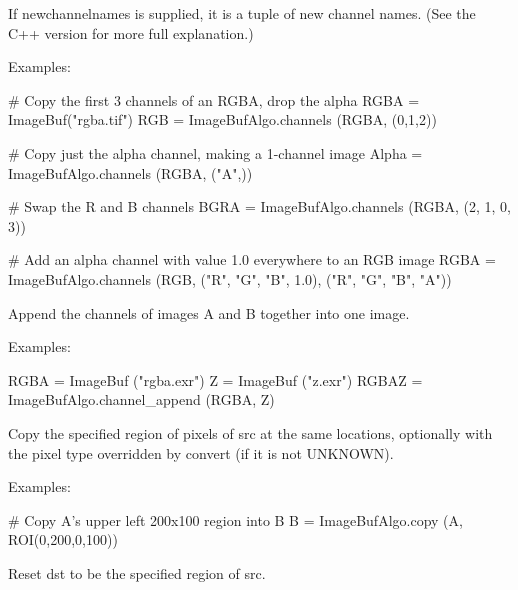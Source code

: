 If {\cf newchannelnames} is supplied, it is a tuple of new channel
names. (See the C++ version for more full explanation.)

\smallskip
\noindent Examples:
\begin{code}
    # Copy the first 3 channels of an RGBA, drop the alpha
    RGBA = ImageBuf("rgba.tif")
    RGB = ImageBufAlgo.channels (RGBA, (0,1,2))

    # Copy just the alpha channel, making a 1-channel image
    Alpha = ImageBufAlgo.channels (RGBA, ("A",))

    # Swap the R and B channels
    BGRA = ImageBufAlgo.channels (RGBA, (2, 1, 0, 3))

    # Add an alpha channel with value 1.0 everywhere to an RGB image
    RGBA = ImageBufAlgo.channels (RGB, ("R", "G", "B", 1.0),
                                  ("R", "G", "B", "A"))
\end{code}
\apiend


 
Append the channels of images {\cf A} and {\cf B} together into one image.

\smallskip
\noindent Examples:
\begin{code}
    RGBA = ImageBuf ("rgba.exr")
    Z = ImageBuf ("z.exr")
    RGBAZ = ImageBufAlgo.channel_append (RGBA, Z)
\end{code}
\apiend


 
Copy the specified region of pixels of {\cf src} at the same
locations, optionally with the pixel
type overridden by {\cf convert} (if it is not {\cf UNKNOWN}).

\smallskip
\noindent Examples:
\begin{code}
    # Copy A's upper left 200x100 region into B
    B = ImageBufAlgo.copy (A, ROI(0,200,0,100))
\end{code}
\apiend


 
Reset {\cf dst} to be the specified region of {\cf src}.

